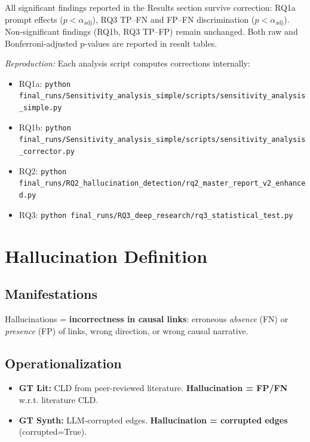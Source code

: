All significant findings reported in the Results section survive correction: RQ1a prompt effects ($p < \alpha_{\text{adj}}$), RQ3 TP--FN and FP--FN discrimination ($p < \alpha_{\text{adj}}$). Non-significant findings (RQ1b, RQ3 TP--FP) remain unchanged. Both raw and Bonferroni-adjusted p-values are reported in result tables.

\textit{Reproduction:} Each analysis script computes corrections internally:
\begin{itemize}[noitemsep]
    \item RQ1a: \texttt{python final\_runs/Sensitivity\_analysis\_simple/scripts/sensitivity\_analysis\_simple.py}
    \item RQ1b: \texttt{python final\_runs/Sensitivity\_analysis\_simple/scripts/sensitivity\_analysis\_corrector.py}
    \item RQ2: \texttt{python final\_runs/RQ2\_hallucination\_detection/rq2\_master\_report\_v2\_enhanced.py}
    \item RQ3: \texttt{python final\_runs/RQ3\_deep\_research/rq3\_statistical\_test.py}
\end{itemize}

\section{Hallucination Definition}
\label{sec:hallucination_definition}

\subsection{Manifestations}
Hallucinations = \textbf{incorrectness in causal links}: erroneous \textit{absence} (FN) or \textit{presence} (FP) of links, wrong direction, or wrong causal narrative.

\subsection{Operationalization}
\begin{itemize}[noitemsep]
    \item \textbf{GT Lit:} CLD from peer-reviewed literature. \textbf{Hallucination = FP/FN} w.r.t. literature CLD.
    \item \textbf{GT Synth:} LLM-corrupted edges. \textbf{Hallucination = corrupted edges} (corrupted=True).
\end{itemize}

